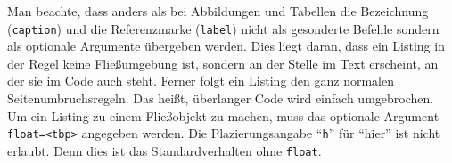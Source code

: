 Man beachte, dass anders als bei Abbildungen und Tabellen
die Bezeichnung (\texttt{caption}) und die Referenzmarke (\texttt{label})
nicht als gesonderte Befehle sondern als optionale Argumente übergeben werden.
Dies liegt daran, dass ein Listing in der Regel keine Fließumgebung ist,
sondern an der Stelle im Text erscheint, an der sie im Code auch steht.
Ferner folgt ein Listing den ganz normalen Seitenumbruchsregeln.
Das heißt, überlanger Code wird einfach umgebrochen. 
Um ein Listing zu einem Fließobjekt zu machen, muss das optionale Argument
\texttt{float=<tbp>} angegeben werden.
Die Plazierungsangabe \enquote{\texttt{h}} für \enquote{hier}
ist nicht erlaubt. Denn dies ist das Standardverhalten ohne \texttt{float}.